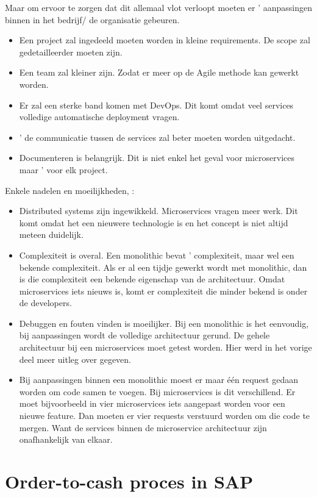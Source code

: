 Maar om ervoor te zorgen dat dit allemaal vlot verloopt moeten er ' aanpassingen binnen in het bedrijf/ de organisatie gebeuren. 
\begin{itemize}
	\item Een project zal ingedeeld moeten worden in kleine requirements. De scope zal gedetailleerder moeten zijn.
	\item Een team zal kleiner zijn. Zodat er meer op de Agile methode kan gewerkt worden.
	\item Er zal een sterke band komen met DevOps. Dit komt omdat veel services volledige automatische deployment vragen.
	\item ' de communicatie tussen de services zal beter moeten worden uitgedacht.
	\item Documenteren is belangrijk. Dit is niet enkel het geval voor microservices maar ' voor elk project.
\end{itemize}

Enkele nadelen en moeilijkheden, \textcite{Koukia2018}:
\begin{itemize}
	\item Distributed systems zijn ingewikkeld. Microservices vragen meer  werk. Dit komt omdat het een nieuwere technologie is en het concept is niet altijd meteen duidelijk. 
	\item Complexiteit is overal. Een monolithic bevat ' complexiteit, maar  wel een bekende complexiteit. Als er al een tijdje gewerkt wordt met monolithic, dan is die complexiteit een bekende eigenschap van de architectuur. Omdat microservices iets nieuws is, komt er complexiteit die minder bekend is onder de developers.
	\item Debuggen en fouten vinden is moeilijker. Bij een monolithic is het eenvoudig, bij aanpassingen wordt de volledige architectuur gerund. De gehele architectuur bij een microservices moet getest worden. Hier werd in het vorige deel meer uitleg over gegeven.
	\item Bij aanpassingen binnen een monolithic moest er maar één request gedaan worden om code samen te voegen. Bij microservices is dit verschillend. Er moet bijvoorbeeld in vier microservices iets aangepast worden voor een nieuwe  feature. Dan moeten er vier requests verstuurd worden om die code te mergen. Want de services binnen de microservice architectuur zijn onafhankelijk van elkaar. 
\end{itemize}

\section{Order-to-cash proces in SAP}
